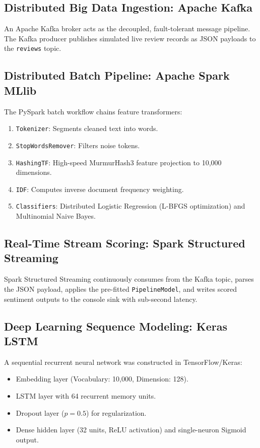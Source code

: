 \documentclass[conference]{IEEEtran}
\begin{document}
\subsection{Distributed Big Data Ingestion: Apache Kafka}
An Apache Kafka broker acts as the decoupled, fault-tolerant message pipeline. The Kafka producer publishes simulated live review records as JSON payloads to the \texttt{reviews} topic.

\subsection{Distributed Batch Pipeline: Apache Spark MLlib}
The PySpark batch workflow chains feature transformers:
\begin{enumerate}
    \item \texttt{Tokenizer}: Segments cleaned text into words.
    \item \texttt{StopWordsRemover}: Filters noise tokens.
    \item \texttt{HashingTF}: High-speed MurmurHash3 feature projection to 10,000 dimensions.
    \item \texttt{IDF}: Computes inverse document frequency weighting.
    \item \texttt{Classifiers}: Distributed Logistic Regression (L-BFGS optimization) and Multinomial Naive Bayes.
\end{enumerate}

\subsection{Real-Time Stream Scoring: Spark Structured Streaming}
Spark Structured Streaming continuously consumes from the Kafka topic, parses the JSON payload, applies the pre-fitted \texttt{PipelineModel}, and writes scored sentiment outputs to the console sink with sub-second latency.

\subsection{Deep Learning Sequence Modeling: Keras LSTM}
A sequential recurrent neural network was constructed in TensorFlow/Keras:
\begin{itemize}
    \item Embedding layer (Vocabulary: 10,000, Dimension: 128).
    \item LSTM layer with 64 recurrent memory units.
    \item Dropout layer ($p = 0.5$) for regularization.
    \item Dense hidden layer (32 units, ReLU activation) and single-neuron Sigmoid output.
\end{itemize}
\end{document}
